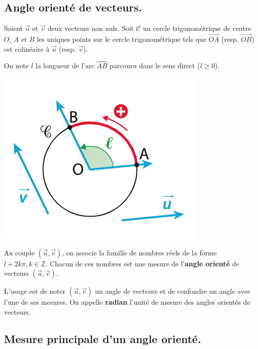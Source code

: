 \documentclass[a4paper,11pt]{article}
\theoremstyle{break}
\begin{document}
   

  
  \subsection{Angle orienté de vecteurs.}
 
  \begin{definition}
  
  Soient $\vec{u}$ et $\vec{v}$ deux vecteurs non nuls. Soit $\mathcal{C}$ un cercle trigonométrique de 
  centre $O$, $A$ et $B$ les uniques points sur le cercle trigonométrique tels que $\vec{OA}$ 
  (resp. $\vec{OB}$) est colinéaire à $\vec{u}$ (resp. $\vec{v}$).
  
  On note $l$ la longueur de l'arc $\wideparen{AB}$ parcouru dans le sens direct ($l \geq 0$).
  
  \begin{center}
    \includegraphics[scale=0.5]{../Images/angleOriente.png}
  \end{center}
  
  Au couple $(\vec{u},\vec{v})$, on associe la famille de nombres réels de la forme 
  $l+2k\pi, k \in \mathbb{Z}$. Chacun de ces nombres est une mesure de l'\textbf{angle orienté}
   de vecteurs $(\vec{u},\vec{v})$.
   
   L'usage est de noter $(\vec{u},\vec{v})$ un angle de vecteurs et de confondre un angle avec l'une
   de ses mesures. On appelle \textbf{radian} l'unité de mesure des angles orientés de vecteurs.

  
  \end{definition}
 
  \newpage
 
 \subsection{Mesure principale d'un angle orienté.}
 
\end{document}
